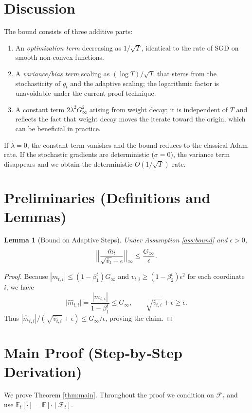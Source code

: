 \documentclass[11pt]{article}
\newtheorem{lemma}{Lemma}
\newcommand{\E}{\mathbb{E}}
\begin{document}
\section*{Discussion}
The bound consists of three additive parts:
\begin{enumerate}
\item An \emph{optimization term} decreasing as $1/\sqrt{T}$, identical to the rate of SGD on smooth non‑convex functions.
\item A \emph{variance/bias term} scaling as $(\log T)/\sqrt{T}$ that stems from the stochasticity of $g_{t}$ and the adaptive scaling; the logarithmic factor is unavoidable under the current proof technique.
\item A constant term $2\lambda^{2}G_{\infty}^{2}$ arising from weight decay; it is independent of $T$ and reflects the fact that weight decay moves the iterate toward the origin, which can be beneficial in practice.
\end{enumerate}
If $\lambda=0$, the constant term vanishes and the bound reduces to the classical Adam rate.  
If the stochastic gradients are deterministic ($\sigma=0$), the variance term disappears and we obtain the deterministic $O(1/\sqrt{T})$ rate.

\newpage
\section*{Preliminaries (Definitions and Lemmas)}
\begin{lemma}[Bound on Adaptive Steps]\label{lem:stepbound}
Under Assumption \ref{ass:bound} and $\epsilon>0$,
\[
\Bigl\|\frac{\hat m_{t}}{\sqrt{\hat v_{t}}+\epsilon}\Bigr\|_{\infty}
\le \frac{G_{\infty}}{\epsilon}.
\]
\end{lemma}
\begin{proof}
Because $|m_{t,i}|\le (1-\beta_{1}^{t})G_{\infty}$ and $v_{t,i}\ge (1-\beta_{2}^{t})\epsilon^{2}$ for each coordinate $i$, we have
\[
\bigl|\hat m_{t,i}\bigr|
=\frac{|m_{t,i}|}{1-\beta_{1}^{t}}\le G_{\infty},\qquad
\sqrt{\hat v_{t,i}}+\epsilon\ge\epsilon.
\]
Thus $|\hat m_{t,i}|/(\sqrt{\hat v_{t,i}}+\epsilon)\le G_{\infty}/\epsilon$,
proving the claim. \qedhere
\end{proof}

\section*{Main Proof (Step‑by‑Step Derivation)}
We prove Theorem \ref{thm:main}. Throughout the proof we condition on $\mathcal{F}_{t}$ and use $\E_{t}[\cdot]=\E[\cdot\mid\mathcal{F}_{t}]$.
\end{document}
